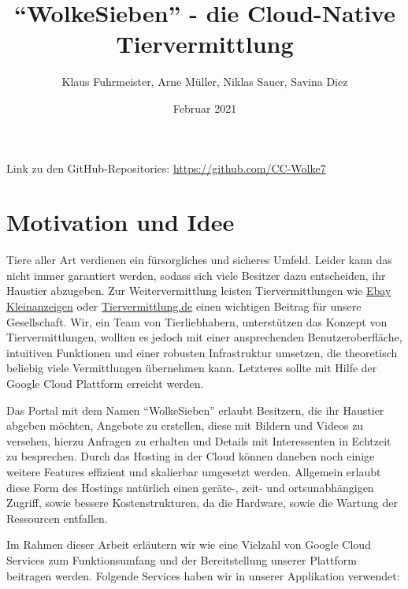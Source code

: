 \documentclass{article}
\title{\enquote{WolkeSieben} - die Cloud-Native Tiervermittlung}
\author{Klaus Fuhrmeister, Arne Müller, Niklas Sauer, Savina Diez}
\date{Februar 2021}
\begin{document}
\maketitle
\paragraph{}
\vspace{10cm}
Link zu den GitHub-Repositories: \url{https://github.com/CC-Wolke7}

\newpage
\tableofcontents
\newpage

\section{Motivation und Idee} %

Tiere aller Art verdienen ein fürsorgliches und sicheres Umfeld. Leider kann das nicht immer garantiert werden, sodass sich viele Besitzer dazu entscheiden, ihr Haustier abzugeben. Zur Weitervermittlung leisten Tiervermittlungen wie \href{https://www.ebay-kleinanzeigen.de/s-haustiere/c130}{Ebay Kleinanzeigen} oder \href{https://www.tiervermittlung.de}{Tiervermittlung.de} einen wichtigen Beitrag für unsere Gesellschaft. Wir, ein Team von Tierliebhabern, unterstützen das Konzept von Tiervermittlungen, wollten es jedoch mit einer ansprechenden Benutzeroberfläche, intuitiven Funktionen und einer robusten Infrastruktur umsetzen, die theoretisch beliebig viele Vermittlungen übernehmen kann. Letzteres sollte mit Hilfe der Google Cloud Plattform erreicht werden. 

Das Portal mit dem Namen \enquote{WolkeSieben} erlaubt Besitzern, die ihr Haustier abgeben möchten, Angebote zu erstellen, diese mit Bildern und Videos zu versehen, hierzu Anfragen zu erhalten und Details mit Interessenten in Echtzeit zu besprechen. Durch das Hosting in der Cloud können daneben noch einige weitere Features effizient und skalierbar umgesetzt werden. Allgemein erlaubt diese Form des Hostings natürlich einen geräte-, zeit- und ortsunabhängigen Zugriff, sowie bessere Kostenstrukturen, da die Hardware, sowie die Wartung der Ressourcen entfallen.

Im Rahmen dieser Arbeit erläutern wir wie eine Vielzahl von Google Cloud Services zum Funktionsumfang und der Bereitstellung unserer Plattform beitragen werden. Folgende Services haben wir in unserer Applikation verwendet:
\end{document}
